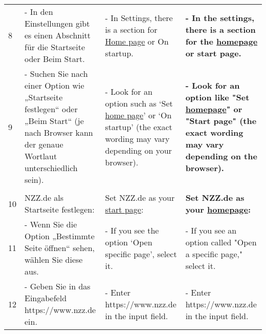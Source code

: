 {\begin{tabularx}{\textwidth}{l>{\raggedright\arraybackslash}X>{\raggedright\arraybackslash}X>{\raggedright\arraybackslash}X}
8  & - In den Einstellungen gibt es einen Abschnitt für die Startseite oder Beim Start.                                                                & - In Settings, there is a section for \underline{Home page} or On startup.                                                                             & \textbf{- In the settings, there is a section for the \underline{homepage} or start page.}                                                                 \\
9  & - Suchen Sie nach einer Option wie „Startseite festlegen“ oder „Beim Start“ (je nach Browser kann der genaue Wortlaut unterschiedlich sein).      & - Look for an option such as ‘Set \underline{home page}’ or ‘On startup’ (the exact wording may vary depending on your browser).                       & \textbf{- Look for an option like "Set \underline{homepage}" or "Start page" (the exact wording may vary depending on the browser).}                       \\
   &                                                                                                                                                   &                                                                                                                                            &                                                                                                                                                \\
10 & NZZ.de als Startseite festlegen:                                                                                                                  & Set NZZ.de as your \underline{start page}:                                                                                                             & \textbf{Set NZZ.de as your \underline{homepage}:}                                                                                                          \\
11 & - Wenn Sie die Option „Bestimmte Seite öffnen“ sehen, wählen Sie diese aus.                                                                       & - If you see the option ‘Open specific page’, select it.                                                                                   & - If you see an option called "Open a specific page," select it.                                                                               \\
12 & - Geben Sie in das Eingabefeld https://www.nzz.de ein.                                                                                            & - Enter https://www.nzz.de in the input field.                                                                                             & - Enter https://www.nzz.de in the input field.                                                                                                 \\

\end{tabularx}}
